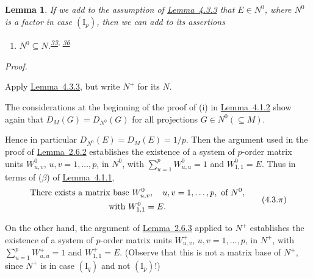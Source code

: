 \documentclass[b5paper,twoside]{article}
\newcommand{\lemref}[2]{\hyperref[#1]{\mbox{Lemma~#2}}}
\theoremstyle{mvnplain}
\newtheorem{lemma}{Lemma}[section]
\renewenvironment{proof}[1][Proof]{%
  \par\addvspace{0.35\baselineskip}%
  \noindent\textit{#1.}\ \normalfont\ignorespaces
}{%
  \par\addvspace{0.35\baselineskip}%
}
\newcommand{\M}{\mathbf M}
\newcommand{\N}{\mathbf N}
\def\M{M}%
\def\N{N}%
\begin{document}
\begin{lemma}\label{lem:4.3.4}
If we add to the assumption of \lemref{lem:4.3.3}{4.3.3} that
\(E\in\N^0\), where \(\N^0\) is a factor in case \((\mathrm I_p)\), then
we can add to its assertions
\begin{enumerate}[label=\((\roman*)\),start=5]
\item \(\N^0\subseteq\N\).\textsuperscript{\hyperlink{fn:33}{33},
\hyperlink{fn:36}{36}}
\end{enumerate}
\end{lemma}

\begin{proof}
Apply \lemref{lem:4.3.3}{4.3.3}, but write \(\N^+\) for its \(\N\).

The considerations at the beginning of the proof of (i) in
\lemref{lem:4.1.2}{4.1.2} show again that
\(D_{\M}(G)=D_{\N^0}(G)\) for all projections
\(G\in\N^0(\subseteq\M)\).

Hence in particular \(D_{\N^0}(E)=D_{\M}(E)=1/p\). Then the argument used
in the proof of \lemref{lem:2.6.2}{2.6.2} establishes the existence of a
system of \(p\)-order matrix units \(W^0_{u,v}\),
\(u,v=1,\ldots,p\), in \(\N^0\), with
\(\sum_{u=1}^{p}W^0_{u,u}=1\) and \(W^0_{1,1}=E\). Thus in terms of
(\(\beta\)) of \lemref{lem:4.1.1}{4.1.1},
\begin{equation}\label{eq:4.3.pi}
\begin{gathered}
\text{There exists a matrix base }W^0_{u,v},\quad u,v=1,\ldots,p,
  \text{ of }\N^0,\\
\text{with }W^0_{1,1}=E.
\end{gathered}
  \tag{4.3.\ensuremath{\pi}}
\end{equation}

On the other hand, the argument of \lemref{lem:2.6.3}{2.6.3} applied to
\(\N^+\) establishes the existence of a system of \(p\)-order matrix units
\(W^+_{u,v}\), \(u,v=1,\ldots,p\), in \(\N^+\), with
\(\sum_{u=1}^{p}W^+_{u,u}=1\) and \(W^+_{1,1}=E\). (Observe that this is not
a matrix base of \(\N^+\), since \(\N^+\) is in case \((\mathrm I_q)\) and
not \((\mathrm I_p)\)!)


\end{proof}
\end{document}
